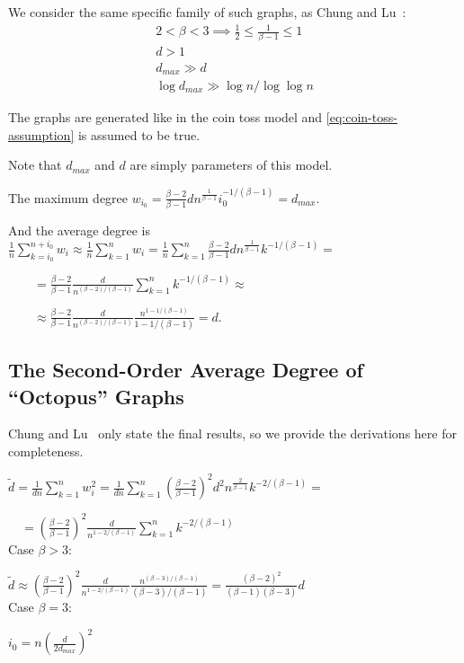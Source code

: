 We consider the same specific family of such graphs, as Chung and Lu~\cite{cl04}:
\begin{gather}
    2<\beta<3\implies\frac{1}{2}\leq\frac{1}{\beta-1}\leq 1\\
    d>1\\
    d_{max}\gg d\\
    \log d_{max}\gg \log n/\log\log n
\end{gather}

The graphs are generated like in the coin toss model
and \eqref{eq:coin-toss-assumption} is assumed to be true.

Note that $d_{max}$ and $d$ are simply parameters of this model.

The maximum degree $w_{i_0}=\frac{\beta-2}{\beta-1}dn^{\frac{1}{\beta-1}}i_0^{-1/(\beta-1)}=d_{max}$.

And the average degree is $\frac{1}{n}\sum_{k=i_0}^{n+i_0}{w_i}
\approx\frac{1}{n}\sum_{k=1}^{n}{w_i}
=\frac{1}{n}\sum_{k=1}^{n}{
    \frac{\beta-2}{\beta-1}dn^{\frac{1}{\beta-1}}k^{-1/(\beta-1)}
}=$

$\qquad=\frac{\beta-2}{\beta-1}\frac{d}{n^{(\beta-2)/(\beta-1)}}
\sum_{k=1}^{n}{k^{-1/(\beta-1)}}\approx$
    
$\qquad\approx\frac{\beta-2}{\beta-1}\frac{d}{n^{(\beta-2)/(\beta-1)}}
\frac{n^{1-1/(\beta-1)}}{1-1/(\beta-1)}=d$.

\subsection{The Second-Order Average Degree of \texorpdfstring{``Octopus''}{"Octopus"} Graphs}

Chung and Lu~\cite{cl04} only state the final results, so we provide
the derivations here for completeness.

$\tilde{d}=\frac{1}{dn}\sum_{k=1}^{n}{w_i^2}
=\frac{1}{dn}\sum_{k=1}^{n}{
    \left(\frac{\beta-2}{\beta-1}\right)^2d^2n^{\frac{2}{\beta-1}}k^{-2/(\beta-1)}
}=$

$\quad=\left(\frac{\beta-2}{\beta-1}\right)^2\frac{d}{n^{1-2/(\beta-1)}}
\sum_{k=1}^{n}{k^{-2/(\beta-1)}}$
\\
Case $\beta>3$:

$\tilde{d}\approx\left(\frac{\beta-2}{\beta-1}\right)^2\frac{d}{n^{1-2/(\beta-1)}}
\frac{n^{(\beta-3)/(\beta-1)}}{(\beta-3)/(\beta-1)}
=\frac{(\beta-2)^2}{(\beta-1)(\beta-3)}d$
\\
Case $\beta=3$:

$i_0=n\left(\frac{d}{2d_{max}}\right)^2$

